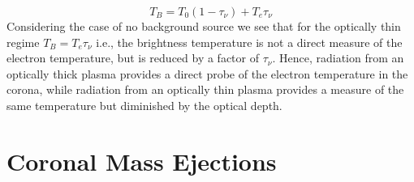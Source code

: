 \begin{equation}
T_B = T_0(1-\tau_{\nu}) + T_e\tau_{\nu}
\end{equation}
Considering the case of no background source we see that for the optically thin regime $T_B = T_e\tau_{\nu}$ i.e., the brightness temperature is not a direct measure of the electron temperature, but is reduced by a factor of $\tau_{\nu}$. 
Hence, radiation from an optically thick plasma provides a direct probe of the electron temperature in the corona, while radiation from an optically thin plasma provides a measure of the same temperature but diminished by the optical depth. 




\section{Coronal Mass Ejections}\label{sec:2}


